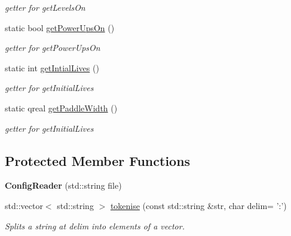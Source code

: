 \begin{DoxyCompactItemize}
\begin{DoxyCompactList}\small\item\em getter for get\+Levels\+On \end{DoxyCompactList}\item 
\hypertarget{class_config_reader_a8c516f5e44bea4583add01ec1f1ee77c}{static bool \hyperlink{class_config_reader_a8c516f5e44bea4583add01ec1f1ee77c}{get\+Power\+Ups\+On} ()}\label{class_config_reader_a8c516f5e44bea4583add01ec1f1ee77c}

\begin{DoxyCompactList}\small\item\em getter for get\+Power\+Ups\+On \end{DoxyCompactList}\item 
\hypertarget{class_config_reader_a97ad5e5e840987a29c5129097a7b142f}{static int \hyperlink{class_config_reader_a97ad5e5e840987a29c5129097a7b142f}{get\+Intial\+Lives} ()}\label{class_config_reader_a97ad5e5e840987a29c5129097a7b142f}

\begin{DoxyCompactList}\small\item\em getter for get\+Initial\+Lives \end{DoxyCompactList}\item 
\hypertarget{class_config_reader_ae8cfce6fc328d7fe50a9b25f14e6048e}{static qreal \hyperlink{class_config_reader_ae8cfce6fc328d7fe50a9b25f14e6048e}{get\+Paddle\+Width} ()}\label{class_config_reader_ae8cfce6fc328d7fe50a9b25f14e6048e}

\begin{DoxyCompactList}\small\item\em getter for get\+Initial\+Lives \end{DoxyCompactList}\end{DoxyCompactItemize}
\subsection*{Protected Member Functions}
\begin{DoxyCompactItemize}
\item 
\hypertarget{class_config_reader_afa28c38668a2d4a0e86224b7f6d384e2}{{\bfseries Config\+Reader} (std\+::string file)}\label{class_config_reader_afa28c38668a2d4a0e86224b7f6d384e2}

\item 
std\+::vector$<$ std\+::string $>$ \hyperlink{class_config_reader_a86bff7c08232bc49e1d7d98104d2cc1b}{tokenise} (const std\+::string \&str, char delim= '\+:')
\begin{DoxyCompactList}\small\item\em Splits a string at delim into elements of a vector. \end{DoxyCompactList}\end{DoxyCompactItemize}


